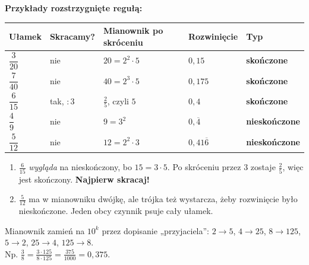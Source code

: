 \documentclass[11pt,a4paper]{article}
\begin{document}
\vspace{0.1em}
\textbf{Przykłady rozstrzygnięte regułą:}
\renewcommand{\arraystretch}{1.15}
\begin{center}
\begin{tabular}{@{}lllll@{}}
\toprule
Ułamek & Skracamy? & Mianownik po skróceniu & Rozwinięcie & Typ \\
\midrule
$\dfrac{3}{20}$ & nie & $20 = 2^{2}\cdot 5$ & $0{,}15$ & \textcolor{skonczony}{\textbf{skończone}} \\
$\dfrac{7}{40}$ & nie & $40 = 2^{3}\cdot 5$ & $0{,}175$ & \textcolor{skonczony}{\textbf{skończone}} \\
$\dfrac{6}{15}$ & tak, $:3$ & $\frac{2}{5}$, czyli $5$ & $0{,}4$ & \textcolor{skonczony}{\textbf{skończone}} \\
$\dfrac{4}{9}$ & nie & $9 = 3^{2}$ & $0{,}\overline{4}$ & \textcolor{okres}{\textbf{nieskończone}} \\
$\dfrac{5}{12}$ & nie & $12 = 2^{2}\cdot 3$ & $0{,}41\overline{6}$ & \textcolor{okres}{\textbf{nieskończone}} \\
\bottomrule
\end{tabular}
\end{center}

\begin{pulapka}
\begin{enumerate}[leftmargin=*, itemsep=2pt]
  \item $\frac{6}{15}$ \emph{wygląda} na nieskończony, bo $15 = 3\cdot 5$. Po skróceniu przez $3$ zostaje $\frac{2}{5}$, więc jest skończony. \textbf{Najpierw skracaj!}
  \item $\frac{5}{12}$ ma w mianowniku dwójkę, ale trójka też wystarcza, żeby rozwinięcie było nieskończone. Jeden obcy czynnik psuje cały ułamek.
\end{enumerate}
\end{pulapka}

\begin{regula}
Mianownik zamień na $10^{k}$ przez dopisanie „przyjaciela”: $2\to 5$, $4\to 25$, $8\to 125$, $5\to 2$, $25\to 4$, $125\to 8$.\\
Np. $\displaystyle\frac{3}{8} = \frac{3\cdot 125}{8\cdot 125} = \frac{375}{1000} = 0{,}375$.
\end{regula}
\end{document}
